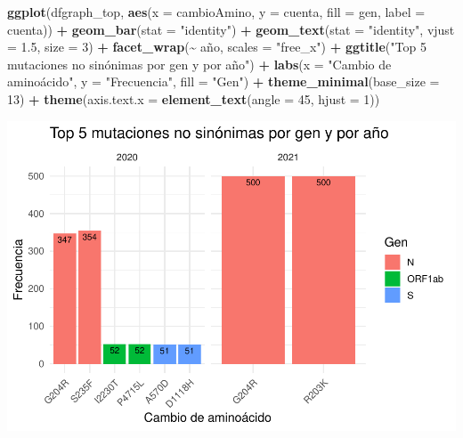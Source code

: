 \documentclass[
]{article}
\newenvironment{Shaded}{\begin{snugshade}}{\end{snugshade}}
\newcommand{\AttributeTok}[1]{\textcolor[rgb]{0.13,0.29,0.53}{#1}}
\newcommand{\DecValTok}[1]{\textcolor[rgb]{0.00,0.00,0.81}{#1}}
\newcommand{\FloatTok}[1]{\textcolor[rgb]{0.00,0.00,0.81}{#1}}
\newcommand{\FunctionTok}[1]{\textcolor[rgb]{0.13,0.29,0.53}{\textbf{#1}}}
\newcommand{\NormalTok}[1]{#1}
\newcommand{\SpecialCharTok}[1]{\textcolor[rgb]{0.81,0.36,0.00}{\textbf{#1}}}
\newcommand{\StringTok}[1]{\textcolor[rgb]{0.31,0.60,0.02}{#1}}
\begin{document}
\begin{Shaded}
\begin{Highlighting}[]
\FunctionTok{ggplot}\NormalTok{(dfgraph\_top, }\FunctionTok{aes}\NormalTok{(}\AttributeTok{x =}\NormalTok{ cambioAmino, }\AttributeTok{y =}\NormalTok{ cuenta, }\AttributeTok{fill =}\NormalTok{ gen, }\AttributeTok{label =}\NormalTok{ cuenta)) }\SpecialCharTok{+}
  \FunctionTok{geom\_bar}\NormalTok{(}\AttributeTok{stat =} \StringTok{"identity"}\NormalTok{) }\SpecialCharTok{+}
  \FunctionTok{geom\_text}\NormalTok{(}\AttributeTok{stat =} \StringTok{"identity"}\NormalTok{, }\AttributeTok{vjust =} \FloatTok{1.5}\NormalTok{, }\AttributeTok{size =} \DecValTok{3}\NormalTok{) }\SpecialCharTok{+}
  \FunctionTok{facet\_wrap}\NormalTok{(}\SpecialCharTok{\textasciitilde{}}\NormalTok{ año, }\AttributeTok{scales =} \StringTok{"free\_x"}\NormalTok{) }\SpecialCharTok{+}
  \FunctionTok{ggtitle}\NormalTok{(}\StringTok{"Top 5 mutaciones no sinónimas por gen y por año"}\NormalTok{) }\SpecialCharTok{+}
  \FunctionTok{labs}\NormalTok{(}\AttributeTok{x =} \StringTok{"Cambio de aminoácido"}\NormalTok{, }\AttributeTok{y =} \StringTok{"Frecuencia"}\NormalTok{, }\AttributeTok{fill =} \StringTok{"Gen"}\NormalTok{) }\SpecialCharTok{+}
  \FunctionTok{theme\_minimal}\NormalTok{(}\AttributeTok{base\_size =} \DecValTok{13}\NormalTok{) }\SpecialCharTok{+}
  \FunctionTok{theme}\NormalTok{(}\AttributeTok{axis.text.x =} \FunctionTok{element\_text}\NormalTok{(}\AttributeTok{angle =} \DecValTok{45}\NormalTok{, }\AttributeTok{hjust =} \DecValTok{1}\NormalTok{))}
\end{Highlighting}
\end{Shaded}

\includegraphics{situacion_problema_files/figure-latex/unnamed-chunk-4-1.pdf}
\end{document}
